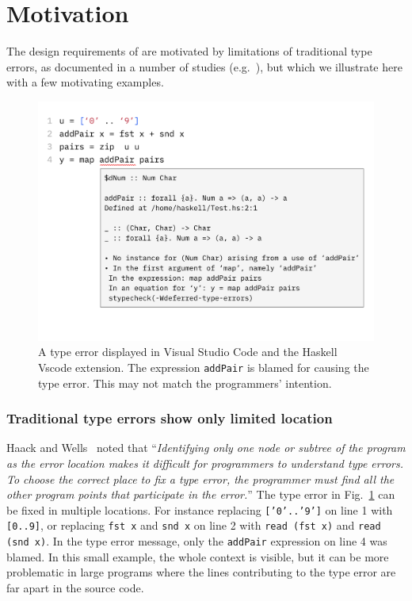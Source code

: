
\section{Motivation}
The design requirements of \chameleon{} are motivated by limitations of traditional type errors, as documented in a number of studies (e.g.~\cite{yang_improved_2000, hage_solved_2020}), but which we illustrate here with a few motivating examples. 

\begin{figure}
    \centering
    \includegraphics[width=\linewidth,trim=0mm 35mm 0mm 0mm]{images/add-pair-example.pdf}
    \caption{
    A type error displayed in Visual Studio Code\cite{microsoft_visual_nodate} and the Haskell Vscode extension\cite{haskell_haskell_nodate}.
The expression \texttt{addPair} is blamed for causing the type error. This may not match the programmers' intention. 
    }
    \label{fig:motivation-example}
\end{figure}
\subsubsection{\textbf{Traditional type errors show only limited location}}
Haack and Wells~\cite{haack_type_2004} noted that ``\textit{Identifying only one node or subtree of the program as the error location makes it difficult for programmers to understand type errors. To choose the correct place to fix a type error, the programmer must find all the other program points that participate in the error.}'' The type error in Fig.~\ref{fig:motivation-example} can be fixed in multiple locations. For instance  replacing \texttt{['0'..'9']} on line 1 with \texttt{[0..9]}, or replacing \texttt{fst x} and \texttt{snd x} on line 2 with \texttt {read (fst x)} and \texttt{read (snd  x)}. In the type error message, only the \texttt{addPair} expression on line 4 was blamed.  In this small example, the whole context is visible, but it can be more problematic in large programs where the lines contributing to the type error are far apart in the source code.

